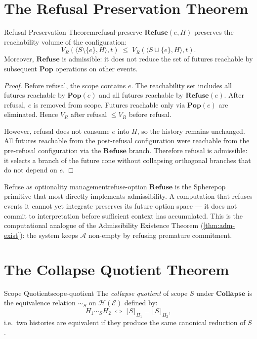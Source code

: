 \documentclass[12pt,twoside,openright]{book}
\newcommand{\csicon} {\marginpar{\tiny\color{DistBlue}\faCode}}
\newcommand{\hist}{\mathcal{H}}
\newcommand{\adm}{\mathcal{A}}
\begin{document}
\section{The Refusal Preservation Theorem}

\begin{theorem}{Refusal Preservation Theorem}{refusal-preserve}
  $\mathbf{Refuse}(e, H)$ preserves the reachability
  volume of the configuration:
  \[
    V_R(\langle S \setminus \{e\}, H \rangle, t)
    \;\le\;
    V_R(\langle S \cup \{e\}, H \rangle, t).
  \]
  Moreover, $\mathbf{Refuse}$ is admissible: it does not
  reduce the set of futures reachable by subsequent
  $\mathbf{Pop}$ operations on other events.
\end{theorem}

\begin{proof}
  Before refusal, the scope contains $e$.
  The reachability set includes all futures reachable
  by $\mathbf{Pop}(e)$ and all futures reachable by
  $\mathbf{Refuse}(e)$.
  After refusal, $e$ is removed from scope.
  Futures reachable only via $\mathbf{Pop}(e)$ are
  eliminated.
  Hence $V_R$ after refusal $\le V_R$ before refusal.

  However, refusal does not consume $e$ into $H$,
  so the history remains unchanged.
  All futures reachable from the post-refusal configuration
  were reachable from the pre-refusal configuration
  via the $\mathbf{Refuse}$ branch.
  Therefore refusal is admissible: it selects a branch
  of the future cone without collapsing orthogonal branches
  that do not depend on $e$.
\end{proof}

\begin{remark}{Refuse as optionality management}{refuse-option}
  \csicon
  $\mathbf{Refuse}$ is the Spherepop primitive that most
  directly implements admissibility. A computation that
  refuses events it cannot yet integrate preserves its
  future option space — it does not commit to
  interpretation before sufficient context has accumulated.
  This is the computational analogue of the Admissibility
  Existence Theorem (\cref{thm:adm-exist}): the system
  keeps $\adm$ non-empty by refusing premature commitment.
\end{remark}

\section{The Collapse Quotient Theorem}

\begin{definition}{Scope Quotient}{scope-quotient}
  The \emph{collapse quotient} of scope $S$ under
  $\mathbf{Collapse}$ is the equivalence relation
  $\sim_S$ on $\hist(\mathcal{E})$ defined by:
  \[
    H_1 \sim_S H_2
    \;\iff\;
    \lfloor S \rfloor_{H_1} = \lfloor S \rfloor_{H_2},
  \]
  i.e.\ two histories are equivalent if they produce
  the same canonical reduction of $S$.
\end{definition}
\end{document}
